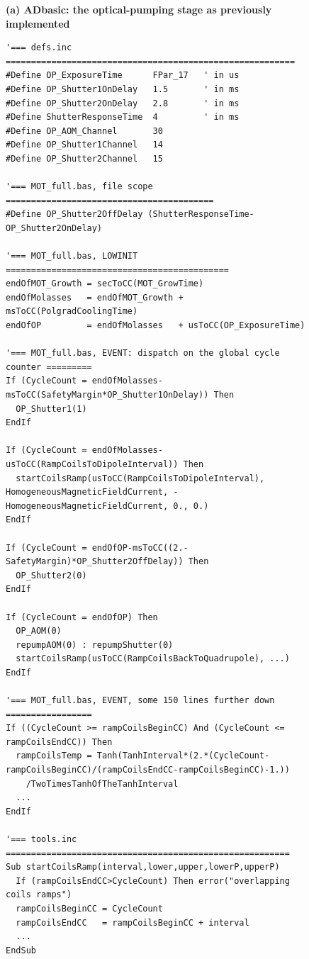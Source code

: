 \documentclass{SciPost}
\newcommand{\mintedsmall}{\fontsize{4pt}{4.8pt}\selectfont}
\begin{document}
\begin{figure}
\centering
\begin{minipage}{.9\linewidth}
\textbf{(a) ADbasic: the optical-pumping stage as previously implemented}
\begin{verbatim}
'=== defs.inc =========================================================
#Define OP_ExposureTime      FPar_17   ' in us
#Define OP_Shutter1OnDelay   1.5       ' in ms
#Define OP_Shutter2OnDelay   2.8       ' in ms
#Define ShutterResponseTime  4         ' in ms
#Define OP_AOM_Channel       30
#Define OP_Shutter1Channel   14
#Define OP_Shutter2Channel   15
 
'=== MOT_full.bas, file scope =========================================
#Define OP_Shutter2OffDelay (ShutterResponseTime-OP_Shutter2OnDelay)
 
'=== MOT_full.bas, LOWINIT ============================================
endOfMOT_Growth = secToCC(MOT_GrowTime)
endOfMolasses   = endOfMOT_Growth + msToCC(PolgradCoolingTime)
endOfOP         = endOfMolasses   + usToCC(OP_ExposureTime)
 
'=== MOT_full.bas, EVENT: dispatch on the global cycle counter =========
If (CycleCount = endOfMolasses-msToCC(SafetyMargin*OP_Shutter1OnDelay)) Then
  OP_Shutter1(1)
EndIf
 
If (CycleCount = endOfMolasses-usToCC(RampCoilsToDipoleInterval)) Then
  startCoilsRamp(usToCC(RampCoilsToDipoleInterval), HomogeneousMagneticFieldCurrent, -HomogeneousMagneticFieldCurrent, 0., 0.)
EndIf
 
If (CycleCount = endOfOP-msToCC((2.-SafetyMargin)*OP_Shutter2OffDelay)) Then
  OP_Shutter2(0)
EndIf
 
If (CycleCount = endOfOP) Then
  OP_AOM(0)
  repumpAOM(0) : repumpShutter(0)
  startCoilsRamp(usToCC(RampCoilsBackToQuadrupole), ...)
EndIf
 
'=== MOT_full.bas, EVENT, some 150 lines further down =================
If ((CycleCount >= rampCoilsBeginCC) And (CycleCount <= rampCoilsEndCC)) Then
  rampCoilsTemp = Tanh(TanhInterval*(2.*(CycleCount-rampCoilsBeginCC)/(rampCoilsEndCC-rampCoilsBeginCC)-1.))
    /TwoTimesTanhOfTheTanhInterval
  ...
EndIf
 
'=== tools.inc ========================================================
Sub startCoilsRamp(interval,lower,upper,lowerP,upperP)
  If (rampCoilsEndCC>CycleCount) Then error("overlapping coils ramps")
  rampCoilsBeginCC = CycleCount
  rampCoilsEndCC   = rampCoilsBeginCC + interval
  ...
EndSub
\end{verbatim}
\end{minipage}
 

\end{figure}
\end{document}
